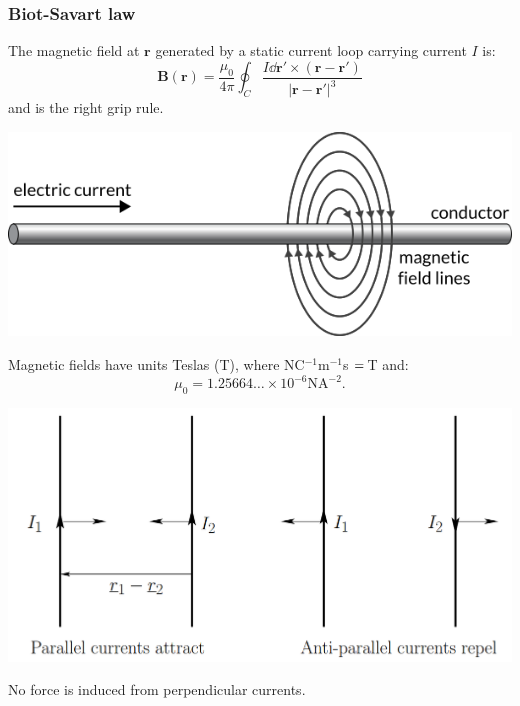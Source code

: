 \documentclass{article}
\newcommand{\vc}[1]{\boldsymbol{#1}}
\begin{document}
\begin{multicols*}{3}
\subsubsection*{Biot-Savart law}
The magnetic field at $\vc{r}$ generated by a static
current loop carrying current $I$ is:
$$\vc{B}(\vc{r})=\frac{\mu_0}{4\pi}\oint_C
\frac{I\dd\vc{r}'\times(\vc{r}-\vc{r}')}{|\vc{r}-\vc{r}'|^3}$$
and is the right grip rule.
\begin{center}
    \includegraphics[scale=0.2]{f05.png}
\end{center}
Magnetic fields have units Teslas (T),
where NC$^{-1}$m$^{-1}$s
$\hspace{0.00000001in}=\hspace{0.02in}$T and:
$$\mu_0=1.25664\dots\times10^{-6}\text{N}\text{A}^{-2}.$$
\begin{center}
    \includegraphics[scale=0.2]{f06.png}
\end{center}
No force is induced from perpendicular currents.


\end{multicols*}
\end{document}
